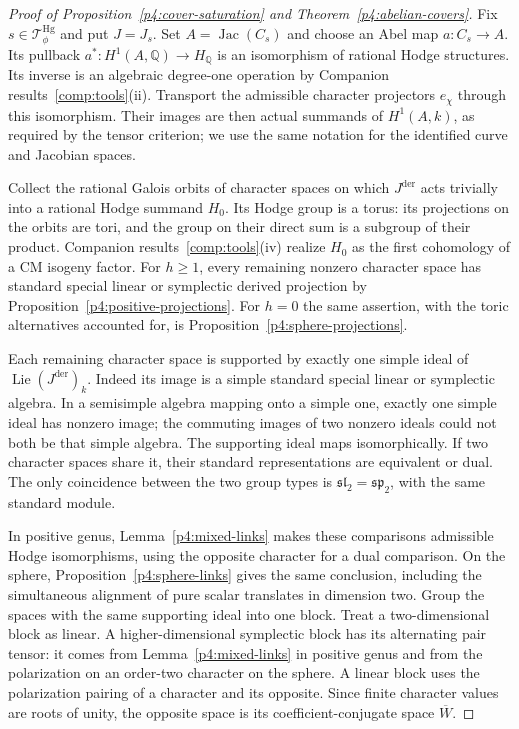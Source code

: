 \documentclass[11pt]{article}
\newcommand{\Q}{\mathbb Q}
\theoremstyle{plain}
\theoremstyle{definition}
\theoremstyle{remark}
\numberwithin{equation}{section}
\begin{document}
\begin{proof}[Proof of Proposition~\ref{p4:cover-saturation} and Theorem~\ref{p4:abelian-covers}]
Fix $s\in\mathcal T_\phi^{\mathrm{Hg}}$ and put $J=J_s$.
Set $A=\operatorname{Jac}(C_s)$ and choose an Abel map $a:C_s\to A$.
Its pullback $a^*:H^1(A,\Q)\to H_\Q$ is an isomorphism of rational
Hodge structures.  Its inverse is an algebraic degree-one operation
by Companion results~\ref{comp:tools}\textup{(ii)}.  Transport the admissible
character projectors $e_\chi$ through this isomorphism.  Their images are then
actual summands of $H^1(A,k)$, as required by the tensor criterion;
we use the same notation for the identified curve and Jacobian spaces.

Collect the rational Galois orbits of character spaces on which
$J^{\mathrm{der}}$ acts trivially into a rational Hodge summand $H_0$.
Its Hodge group is a torus: its projections on the orbits are tori,
and the group on their direct sum is a subgroup of their product.
Companion results~\ref{comp:tools}\textup{(iv)}
realize $H_0$ as the first cohomology of a CM isogeny factor.
For $h\ge1$, every remaining nonzero character space has standard
special linear or symplectic derived projection by
Proposition~\ref{p4:positive-projections}.  For $h=0$ the same
assertion, with the toric alternatives accounted for, is
Proposition~\ref{p4:sphere-projections}.

Each remaining character space is supported by exactly one simple
ideal of $\operatorname{Lie}(J^{\mathrm{der}})_k$.  Indeed its image is
a simple standard special linear or symplectic algebra.  In a
semisimple algebra mapping onto a simple one, exactly one simple ideal
has nonzero image; the commuting images of two nonzero ideals could
not both be that simple algebra.  The supporting ideal maps
isomorphically.  If two character spaces share it, their standard
representations are equivalent or dual.  The only coincidence
between the two group types is
$\mathfrak{sl}_2=\mathfrak{sp}_2$, with the same standard module.

In positive genus, Lemma~\ref{p4:mixed-links} makes these comparisons
admissible Hodge isomorphisms, using the opposite character for a dual
comparison.  On the sphere, Proposition~\ref{p4:sphere-links} gives
the same conclusion, including the simultaneous alignment of pure
scalar translates in dimension two.  Group the spaces with the same
supporting ideal into one block.  Treat a two-dimensional block as
linear.  A higher-dimensional symplectic block has its alternating
pair tensor: it comes from Lemma~\ref{p4:mixed-links} in positive
genus and from the polarization on an order-two character on the
sphere.  A linear block uses the polarization pairing of a character
and its opposite.  Since finite character values are roots of unity,
the opposite space is its coefficient-conjugate space
$\overline W$.


\end{proof}
\end{document}
